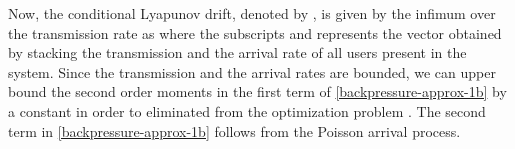 Now, the conditional Lyapunov drift, denoted by , is given by the infimum over the transmission rate as
\iftoggle{single_column}{
\begin{IEEEeqnarray}{rCl} \label{backpressure-approx}
	\underset{\mbf{t}}{\text{inf}} &\quad& \Delta(\mbf{Q}(i)) \triangleq \mathbb{E}_{\mbfa{\lambda},\mbf{t}} \set{\mathrm{L}\sset{\mbf{Q}(i+1)} - \mathrm{L}\sset{\mbf{Q}(i)} \vert \mbf{Q}(i)} \IEEEyessubnumber \\
	&\leq& \underbrace{\mathbb{E}_{\mbfa{\lambda},\mbf{t}} \set {\sum_{k \in \mc{U}} \, \frac{\lambda^2_k(i) + t_k^2(i)}{2} \vert \mbf{Q}(i)}}_{\le B} + \sum_{k \in \mc{U}} Q_k(i) A_k(i) - \mathbb{E}_{\mbfa{\lambda},\mbf{t}}\set{\sum_{k \in \mc{U}} Q_k(i) t_k(i)  \vert \mbf{Q}(i)}, \eqsub \label{backpressure-approx-1b}
\end{IEEEeqnarray}}{
\begin{IEEEeqnarray}{CL} \label{backpressure-approx}
	\underset{\mbf{t}}{\text{inf}} \quad & \mathbb{E}_{\mbfa{\lambda},\mbf{t}} \set{\mathrm{L}\sset{\mbf{Q}(i+1)} - \mathrm{L}\sset{\mbf{Q}(i)} \vert \mbf{Q}(i)} \IEEEyessubnumber \\
	\leq & \underbrace{\mathbb{E}_{\mbfa{\lambda},\mbf{t}} \Big \lbrace \sum_{k \in \mc{U}} \frac{\lambda^2_k(i) + t_k^2(i)}{2} \vert \mbf{Q}(i) \Big \rbrace }_{\le B} + \sum_{k \in \mc{U}} Q_k(i) A_k(i) \nonumber \\
	& \qquad \qquad {} - \mathbb{E}_{\mbfa{\lambda},\mbf{t}}\Big \lbrace \sum_{k \in \mc{U}} Q_k(i) t_k(i)  \vert \mbf{Q}(i) \Big \rbrace, \eqsub \label{backpressure-approx-1b}
\end{IEEEeqnarray}}
where the subscripts  and \me{\mbfa{\lambda}} represents the vector obtained by stacking the transmission and the arrival rate of all users present in the system. Since the transmission and the arrival rates are bounded, we can upper bound the second order moments in the first term of \eqref{backpressure-approx-1b} by a constant  in order to  eliminated from the optimization problem \cite{neely2010stochastic}. The second term in \eqref{backpressure-approx-1b} follows from the Poisson arrival process.

